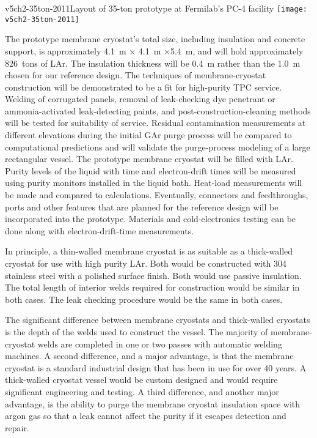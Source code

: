 \begin{cdrfigure}{v5ch2-35ton-2011}{Layout of 35-ton prototype at Fermilab's PC-4 facility}
\texttt{[image: v5ch2-35ton-2011]} 
\end{cdrfigure}

The prototype membrane cryostat's total size, including insulation and concrete support, is approximately 4.1~m $\times$ 4.1~m $\times$5.4~m, and will hold approximately 826~tons of LAr. The insulation thickness will be 0.4~m rather than the 1.0~m chosen for our reference design.  The techniques of membrane-cryostat construction will be demonstrated to be a fit for high-purity TPC service.  Welding of corrugated panels, removal of leak-checking dye penetrant or ammonia-activated leak-detecting paints, and post-construction-cleaning methods will be tested for suitability of service.  Residual contamination measurements at different elevations during the initial GAr purge process will be compared to computational predictions and will validate the purge-process modeling of a large rectangular vessel.  The prototype membrane cryostat will be filled with LAr.  Purity levels of the liquid with time and electron-drift times will be measured using purity monitors installed in the liquid bath.  Heat-load measurements will be made and compared to calculations. Eventually, connectors and feedthroughs, ports and other features that are planned for the reference design will be incorporated into the prototype.  Materials and cold-electronics testing can be done along with electron-drift-time measurements.

In principle, a thin-walled membrane cryostat is as suitable as a thick-walled cryostat for use with high purity LAr. Both would be constructed with 304 stainless steel with a polished surface finish. Both would use passive insulation. The total length of interior welds required for construction would be similar in both cases. The leak checking procedure would be the same in both cases.

The significant difference between membrane cryostats and thick-walled cryostats is the depth of the welds used to construct the vessel.  The majority of membrane-cryostat welds are completed in one or two passes with automatic welding machines. A second difference, and a major advantage, is that the membrane cryostat is a standard industrial design that has been in use for over 40 years. A thick-walled cryostat vessel would be custom designed and would require significant engineering and testing. A third difference, and another major advantage, is the ability to purge the membrane cryostat insulation space with argon gas so that a leak cannot affect the purity if it escapes detection and repair. 

